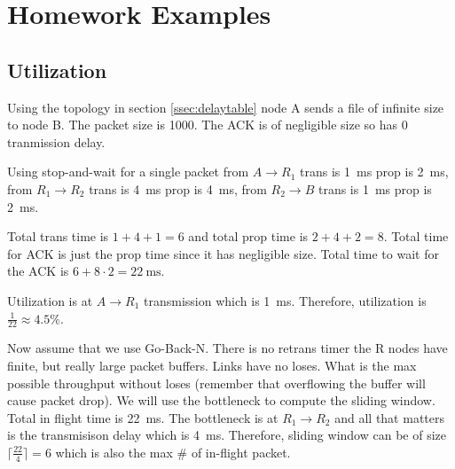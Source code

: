\section{Homework Examples}
\subsection{Utilization}
Using the topology in section \ref{ssec:delaytable} node A sends a file
of infinite size to node B. The packet size is \qty{1000}{\byte}. The
ACK is of negligible size so has 0 tranmission delay.

Using stop-and-wait for a single packet from $A\to R_1$ trans is \qty{1}{\milli\second} prop
is \qty{2}{\milli\second}, from $R_1\to R_2$ trans is
\qty{4}{\milli\second} prop is \qty{4}{\milli\second}, from $R_2\to B$
trans is \qty{1}{\milli\second} prop is \qty{2}{\milli\second}.

Total trans time is $1+4+1=6$ and total prop time is $2+4+2=8$. Total
time for ACK is just the prop time since it has negligible size. Total
time to wait for the ACK is $6+8\cdot2 = \qty{22}{\milli\second}$.

Utilization is at $A\to R_1$ transmission which is
\qty{1}{\milli\second}. Therefore, utilization is $\frac{1}{22}\approx
4.5\%$.

Now assume that we use Go-Back-N. There is no retrans timer the R nodes
have finite, but really large packet buffers. Links have no loses. What
is the max possible throughput without loses (remember that overflowing
the buffer will cause packet drop). We will use the bottleneck to
compute the sliding window. Total in flight time is
\qty{22}{\milli\second}. The bottleneck is at $R_1\to R_2$ and all that
matters is the transmisison delay which is \qty{4}{\milli\second}.
Therefore, sliding window can be of size $\lceil\frac{22}{4}\rceil=6$
which is also the max \# of in-flight packet.